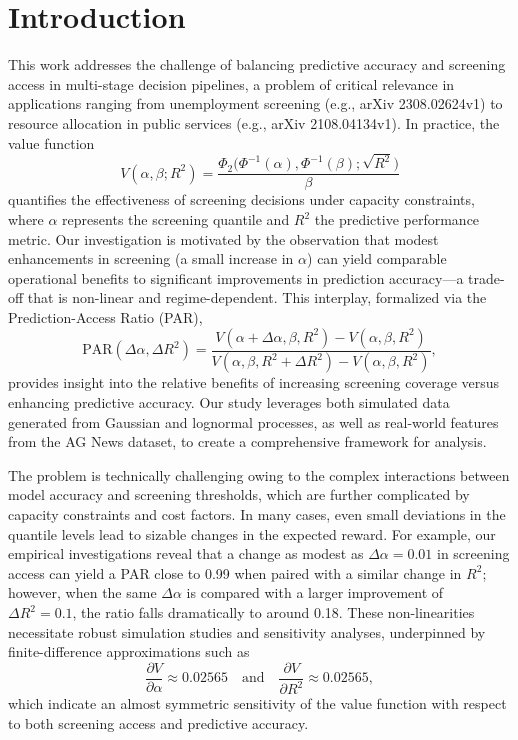 \documentclass[11pt]{article}
\begin{document}
\section{Introduction}
This work addresses the challenge of balancing predictive accuracy and screening access in multi-stage decision pipelines, a problem of critical relevance in applications ranging from unemployment screening (e.g., arXiv 2308.02624v1) to resource allocation in public services (e.g., arXiv 2108.04134v1). In practice, the value function 
\[
V(\alpha,\beta;R^2)=\frac{\Phi_2\big(\Phi^{-1}(\alpha),\Phi^{-1}(\beta);\sqrt{R^2}\big)}{\beta}
\]
quantifies the effectiveness of screening decisions under capacity constraints, where \(\alpha\) represents the screening quantile and \(R^2\) the predictive performance metric. Our investigation is motivated by the observation that modest enhancements in screening (a small increase in \(\alpha\)) can yield comparable operational benefits to significant improvements in prediction accuracy—a trade-off that is non-linear and regime-dependent. This interplay, formalized via the Prediction-Access Ratio (PAR),
\[
\text{PAR}(\Delta \alpha, \Delta R^2)=\frac{V(\alpha+\Delta \alpha,\beta,R^2)-V(\alpha,\beta,R^2)}{V(\alpha,\beta,R^2+\Delta R^2)-V(\alpha,\beta,R^2)},
\]
provides insight into the relative benefits of increasing screening coverage versus enhancing predictive accuracy. Our study leverages both simulated data generated from Gaussian and lognormal processes, as well as real-world features from the AG News dataset, to create a comprehensive framework for analysis.

The problem is technically challenging owing to the complex interactions between model accuracy and screening thresholds, which are further complicated by capacity constraints and cost factors. In many cases, even small deviations in the quantile levels lead to sizable changes in the expected reward. For example, our empirical investigations reveal that a change as modest as \(\Delta \alpha=0.01\) in screening access can yield a PAR close to 0.99 when paired with a similar change in \(R^2\); however, when the same \(\Delta \alpha\) is compared with a larger improvement of \(\Delta R^2=0.1\), the ratio falls dramatically to around 0.18. These non-linearities necessitate robust simulation studies and sensitivity analyses, underpinned by finite-difference approximations such as
\[
\frac{\partial V}{\partial \alpha}\approx 0.02565 \quad \text{and} \quad \frac{\partial V}{\partial R^2}\approx 0.02565,
\]
which indicate an almost symmetric sensitivity of the value function with respect to both screening access and predictive accuracy.
\end{document}
